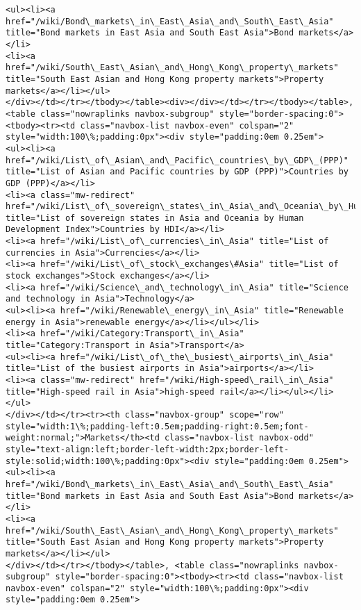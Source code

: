 \documentclass[11pt]{article}
\begin{document}
\begin{Verbatim}[commandchars=\\\{\}]
<ul><li><a href="/wiki/Bond\_markets\_in\_East\_Asia\_and\_South\_East\_Asia" title="Bond markets in East Asia and South East Asia">Bond markets</a></li>
<li><a href="/wiki/South\_East\_Asian\_and\_Hong\_Kong\_property\_markets" title="South East Asian and Hong Kong property markets">Property markets</a></li></ul>
</div></td></tr></tbody></table><div></div></td></tr></tbody></table>, <table class="nowraplinks navbox-subgroup" style="border-spacing:0"><tbody><tr><td class="navbox-list navbox-even" colspan="2" style="width:100\%;padding:0px"><div style="padding:0em 0.25em">
<ul><li><a href="/wiki/List\_of\_Asian\_and\_Pacific\_countries\_by\_GDP\_(PPP)" title="List of Asian and Pacific countries by GDP (PPP)">Countries by GDP (PPP)</a></li>
<li><a class="mw-redirect" href="/wiki/List\_of\_sovereign\_states\_in\_Asia\_and\_Oceania\_by\_Human\_Development\_Index" title="List of sovereign states in Asia and Oceania by Human Development Index">Countries by HDI</a></li>
<li><a href="/wiki/List\_of\_currencies\_in\_Asia" title="List of currencies in Asia">Currencies</a></li>
<li><a href="/wiki/List\_of\_stock\_exchanges\#Asia" title="List of stock exchanges">Stock exchanges</a></li>
<li><a href="/wiki/Science\_and\_technology\_in\_Asia" title="Science and technology in Asia">Technology</a>
<ul><li><a href="/wiki/Renewable\_energy\_in\_Asia" title="Renewable energy in Asia">renewable energy</a></li></ul></li>
<li><a href="/wiki/Category:Transport\_in\_Asia" title="Category:Transport in Asia">Transport</a>
<ul><li><a href="/wiki/List\_of\_the\_busiest\_airports\_in\_Asia" title="List of the busiest airports in Asia">airports</a></li>
<li><a class="mw-redirect" href="/wiki/High-speed\_rail\_in\_Asia" title="High-speed rail in Asia">high-speed rail</a></li></ul></li></ul>
</div></td></tr><tr><th class="navbox-group" scope="row" style="width:1\%;padding-left:0.5em;padding-right:0.5em;font-weight:normal;">Markets</th><td class="navbox-list navbox-odd" style="text-align:left;border-left-width:2px;border-left-style:solid;width:100\%;padding:0px"><div style="padding:0em 0.25em">
<ul><li><a href="/wiki/Bond\_markets\_in\_East\_Asia\_and\_South\_East\_Asia" title="Bond markets in East Asia and South East Asia">Bond markets</a></li>
<li><a href="/wiki/South\_East\_Asian\_and\_Hong\_Kong\_property\_markets" title="South East Asian and Hong Kong property markets">Property markets</a></li></ul>
</div></td></tr></tbody></table>, <table class="nowraplinks navbox-subgroup" style="border-spacing:0"><tbody><tr><td class="navbox-list navbox-even" colspan="2" style="width:100\%;padding:0px"><div style="padding:0em 0.25em">

\end{Verbatim}
\end{document}

